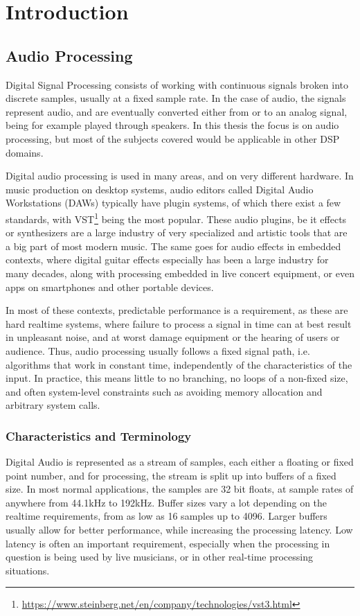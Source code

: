 \chapter{Introduction}
\label{chap:intro}

\section{Audio Processing}

Digital Signal Processing consists of working with continuous signals broken into discrete samples, usually
at a fixed sample rate. In the case of audio, the signals represent audio, and are eventually converted
either from or to an analog signal, being for example played through speakers. In this thesis the focus is on
audio processing, but most of the subjects covered would be applicable in other DSP domains.

Digital audio processing is used in many areas, and on very different hardware. In music production on
desktop systems, audio editors called Digital Audio Workstations (DAWs) typically have plugin systems, of
which there exist a few standards, with VST\footnote{\url{https://www.steinberg.net/en/company/technologies/vst3.html}} being the most popular. These audio
plugins, be it effects or synthesizers are a large industry of very specialized and artistic tools that are a
big part of most modern music. The same goes for audio effects in embedded contexts, where digital guitar
effects especially has been a large industry for many decades, along with processing embedded in live concert
equipment, or even apps on smartphones and other portable devices.

In most of these contexts, predictable performance is a requirement, as these are hard realtime systems,
where failure to process a signal in time can at best result in unpleasant noise, and at worst damage
equipment or the hearing of users or audience. Thus, audio processing usually follows a fixed signal path,
i.e. algorithms that work in constant time, independently of the characteristics of the input. In practice,
this means little to no branching, no loops of a non-fixed size, and often system-level constraints such as
avoiding memory allocation and arbitrary system calls.

\subsection{Characteristics and Terminology}

Digital Audio is represented as a stream of samples, each either a floating or fixed point number, and for
processing, the stream is split up into buffers of a fixed size. In most normal applications, the samples are
32 bit floats, at sample rates of anywhere from 44.1kHz to 192kHz. Buffer sizes vary a lot depending on the
realtime requirements, from as low as 16 samples up to 4096. Larger buffers usually allow for better
performance, while increasing the processing latency. Low latency is often an important requirement,
especially when the processing in question is being used by live musicians, or in other real-time processing
situations.

